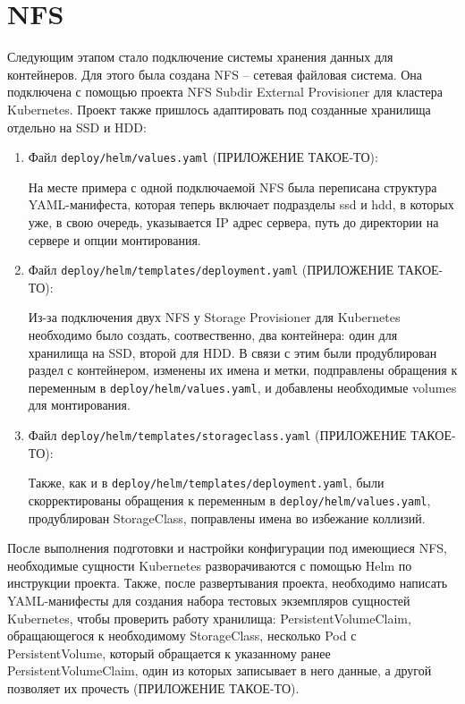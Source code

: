 \section{NFS}
\label{sec:nfs}

Следующим этапом стало подключение системы хранения данных для контейнеров. Для этого была создана NFS
-- сетевая файловая система. Она подключена с помощью проекта NFS Subdir External Provisioner для кластера Kubernetes. Проект также пришлось адаптировать под созданные хранилища отдельно на SSD
и HDD:
\begin{enumerate}
    \item Файл \texttt{deploy/helm/values.yaml} (ПРИЛОЖЕНИЕ ТАКОЕ-ТО):

        На месте примера с одной подключаемой NFS была переписана структура YAML-манифеста, которая теперь включает подразделы ssd и hdd, в которых уже, в свою очередь, указывается IP адрес сервера, путь до директории на сервере и опции монтирования.

    \item Файл \texttt{deploy/helm/templates/deployment.yaml} (ПРИЛОЖЕНИЕ ТАКОЕ-ТО):

        Из-за подключения двух NFS у Storage Provisioner
        для Kubernetes необходимо было создать, соотвественно, два контейнера: один для хранилища на SSD, второй для HDD. В связи с этим были продублирован раздел с контейнером, изменены их имена и метки, подправлены обращения к переменным в \texttt{deploy/helm/values.yaml}, и добавлены необходимые volumes
        для монтирования.

    \item Файл \texttt{deploy/helm/templates/storageclass.yaml} (ПРИЛОЖЕНИЕ ТАКОЕ-ТО):

        Также, как и в \texttt{deploy/helm/templates/deployment.yaml}, были скорректированы обращения к переменным в \texttt{deploy/helm/values.yaml}, продублирован StorageClass,
        поправлены имена во избежание коллизий.

\end{enumerate}

После выполнения подготовки и настройки конфигурации под имеющиеся NFS, необходимые сущности Kubernetes разворачиваются с помощью Helm по инструкции проекта. Также, после развертывания проекта, необходимо написать YAML-манифесты для создания набора тестовых экземпляров сущностей Kubernetes, чтобы проверить работу хранилища: PersistentVolumeClaim,
обращающегося к необходимому StorageClass, несколько Pod
 с PersistentVolume,
который обращается к указанному ранее PersistentVolumeClaim, один из которых записывает в него данные, а другой позволяет их прочесть (ПРИЛОЖЕНИЕ ТАКОЕ-ТО).
